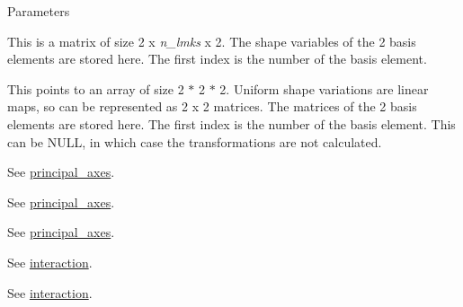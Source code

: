 \begin{DoxyParams}{Parameters}
\item[\mbox{\tt[out]} {\em basis}]This is a matrix of size 2 x {\itshape n\_\-lmks\/} x 2. The shape variables of the 2 basis elements are stored here. The first index is the number of the basis element. \item[\mbox{\tt[out]} {\em transforms\_\-opt}]This points to an array of size 2 $\ast$ 2 $\ast$ 2. Uniform shape variations are linear maps, so can be represented as 2 x 2 matrices. The matrices of the 2 basis elements are stored here. The first index is the number of the basis element. This can be {\ttfamily NULL}, in which case the transformations are not calculated. \item[\mbox{\tt[in]} {\em centroid}]See \hyperlink{classew_1_1Tps2_aa5177ff7fb842da0e20f153c1b992765}{principal\_\-axes}. \item[\mbox{\tt[in]} {\em sum\_\-squares}]See \hyperlink{classew_1_1Tps2_aa5177ff7fb842da0e20f153c1b992765}{principal\_\-axes}. \item[\mbox{\tt[in]} {\em axes}]See \hyperlink{classew_1_1Tps2_aa5177ff7fb842da0e20f153c1b992765}{principal\_\-axes}. \item[\mbox{\tt[in]} {\em lmks}]See \hyperlink{classew_1_1Tps2_a7f04e98fa574f821257e904658b2bb8b}{interaction}. \item[\mbox{\tt[in]} {\em n\_\-lmks}]See \hyperlink{classew_1_1Tps2_a7f04e98fa574f821257e904658b2bb8b}{interaction}. \end{DoxyParams}
